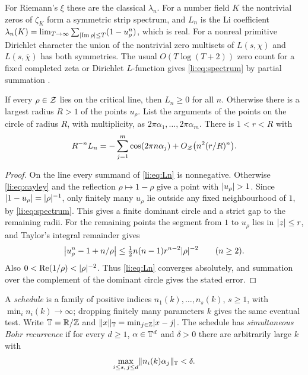 For Riemann's $\xi$ these are the classical $\lambda_n$. For a number field $K$ the
nontrivial zeros of $\zeta_K$ form a symmetric strip spectrum, and $L_n$ is the Li
coefficient $\lambda_n(K)=\lim_{T\to\infty}\sum_{\lvert\operatorname{Im}\rho\rvert\le T}(1-u_\rho^n)$, which is
real. For a nonreal primitive Dirichlet character the union of the nontrivial zero multisets
of $L(s,\chi)$ and $L(s,\bar\chi)$ has both symmetries. The usual $O(T\log(T+2))$ zero count
for a fixed completed zeta or Dirichlet $L$-function gives \eqref{li:eq:spectrum} by partial
summation \cite{Lagarias2007Li}.

\begin{lemma}\label{li:lem:dom}
If every $\rho\in\mathcal{Z}$ lies on the critical line, then $L_n\ge0$ for all $n$. Otherwise there
is a largest radius $R>1$ of the points $u_\rho$. List the arguments of the points on the
circle of radius $R$, with multiplicity, as $2\pi\alpha_1,\dots,2\pi\alpha_m$. There is
$1<r<R$ with
\[
 R^{-n}L_n=-\sum_{j=1}^m\cos(2\pi n\alpha_j)+O_{\mathcal{Z}}\bigl(n^2(r/R)^n\bigr).
\]
\end{lemma}

\begin{proof}
On the line every summand of \eqref{li:eq:Ln} is nonnegative. Otherwise
\eqref{li:eq:cayley} and the reflection $\rho\mapsto1-\rho$ give a point with $\lvert u_\rho\rvert>1$.
Since $\lvert1-u_\rho\rvert=\lvert\rho\rvert^{-1}$, only finitely many $u_\rho$ lie outside any fixed
neighbourhood of $1$, by \eqref{li:eq:spectrum}. This gives a finite dominant circle and a
strict gap to the remaining radii. For the remaining points the segment from $1$ to $u_\rho$
lies in $\lvert z\rvert\le r$, and Taylor's integral remainder gives
\[
 \bigl|u_\rho^n-1+n/\rho\bigr|\le\tfrac12n(n-1)r^{n-2}\lvert\rho\rvert^{-2}\qquad(n\ge2).
\]
Also $0<\operatorname{Re}(1/\rho)<\lvert\rho\rvert^{-2}$. Thus \eqref{li:eq:Ln} converges absolutely, and summation
over the complement of the dominant circle gives the stated error.
\end{proof}

\begin{definition}\label{li:def:bohr}
A \emph{schedule} is a family of positive indices $n_1(k),\dots,n_s(k)$, $s\ge1$, with
$\min_in_i(k)\to\infty$; dropping finitely many parameters $k$ gives the same eventual test.
Write $\mathbb{T}=\mathbb{R}/\mathbb{Z}$ and $\lVert x\rVert_{\mathbb{T}}=\min_{j\in\mathbb{Z}}\lvert x-j\rvert$. The schedule has
\emph{simultaneous Bohr recurrence} if for every $d\ge1$, $\alpha\in\mathbb{T}^d$ and $\delta>0$
there are arbitrarily large $k$ with
\begin{equation}\label{li:eq:return}
 \max_{i\le s,\,j\le d}\lVert n_i(k)\alpha_j\rVert_{\mathbb{T}}<\delta .
\end{equation}
\end{definition}

